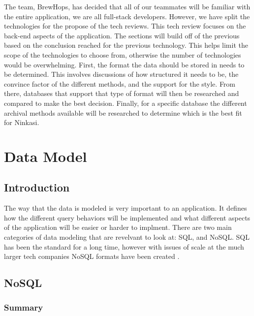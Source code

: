 \documentclass[draftclsnofoot,onecolumn,journal,letterpaper,compsoc,10pt]{IEEEtran}
\begin{document}
The team, BrewHops, has decided that all of our teammates will be familiar with the entire application, we are all full-stack developers.  However, we have split the technologies for the propose of the tech reviews.  This tech review focuses on the back-end aspects of the application.  The sections will build off of the previous based on the conclusion reached for the previous technology.  This helps limit the scope of the technologies to choose from, otherwise the number of technologies would be overwhelming.  First, the format the data should be stored in needs to be determined.  This involves discussions of how structured it needs to be, the convince factor of the different methods, and the support for the style.  From there, databases that support that type of format will then be researched and compared to make the best decision.  Finally, for a specific database the different archival methods available will be researched to determine which is the best fit for Ninkasi.

\section{Data Model}

    \subsection{Introduction}
    
    The way that the data is modeled is very important to an application.  It defines how the different query behaviors will be implemented and what different aspects of the application will be easier or harder to implment.  There are two main categories of data modeling that are revelvant to look at: SQL, and NoSQL.  SQL has been the standard for a long time, however with issues of scale at the much larger tech companies NoSQL formats have been created \cite{sqlizer}.
    
    \subsection{NoSQL}
    
        \subsubsection{Summary}
        
\end{document}
